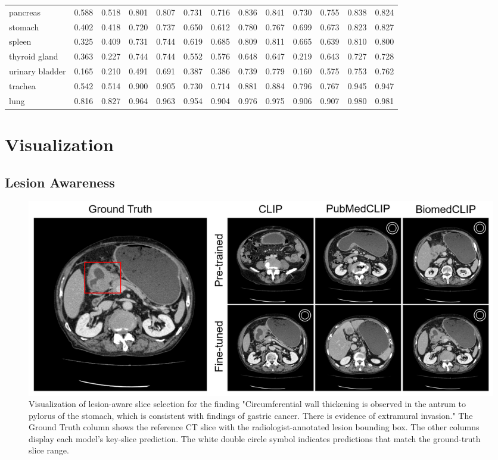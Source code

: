 \documentclass[bioengineering,article,submit,pdftex,moreauthors]{Definitions/mdpi}
\begin{document}
\begin{landscape}
\begin{table}[ht]
\begin{tabular}{l*{6}{cc}}
    pancreas          & 0.588 & 0.518 & 0.801 & 0.807 & 0.731 & 0.716 & 0.836 & 0.841 & 0.730 & 0.755 & 0.838 & 0.824 \\
    stomach           & 0.402 & 0.418 & 0.720 & 0.737 & 0.650 & 0.612 & 0.780 & 0.767 & 0.699 & 0.673 & 0.823 & 0.827 \\
    spleen            & 0.325 & 0.409 & 0.731 & 0.744 & 0.619 & 0.685 & 0.809 & 0.811 & 0.665 & 0.639 & 0.810 & 0.800 \\
    thyroid gland     & 0.363 & 0.227 & 0.744 & 0.744 & 0.552 & 0.576 & 0.648 & 0.647 & 0.219 & 0.643 & 0.727 & 0.728 \\
    urinary bladder   & 0.165 & 0.210 & 0.491 & 0.691 & 0.387 & 0.386 & 0.739 & 0.779 & 0.160 & 0.575 & 0.753 & 0.762 \\
    trachea           & 0.542 & 0.514 & 0.900 & 0.905 & 0.730 & 0.714 & 0.881 & 0.884 & 0.796 & 0.767 & 0.945 & 0.947 \\
    lung              & 0.816 & 0.827 & 0.964 & 0.963 & 0.954 & 0.904 & 0.976 & 0.975 & 0.906 & 0.907 & 0.980 & 0.981 \\
    \bottomrule
  \end{tabular}
\end{table}
\end{landscape}


\section{Visualization}\label{app:visualization}
\subsection{Lesion Awareness}

\begin{figure}[ht]
  \centering
  \includegraphics[width=1\textwidth]{./figures/app_lesion_aware_inst6_2.png}
  \caption{Visualization of lesion-aware slice selection for the finding 
  "Circumferential wall thickening is observed in the antrum to pylorus of the stomach, which is consistent with findings of gastric cancer. 
  There is evidence of extramural invasion."
  The Ground Truth column shows the reference CT slice with the radiologist-annotated lesion bounding box.
  The other columns display each model’s key-slice prediction.
  The white double circle symbol indicates predictions that match the ground-truth slice range.}
  \label{fig:lesion_aware_inst6}
\end{figure}
\end{document}
